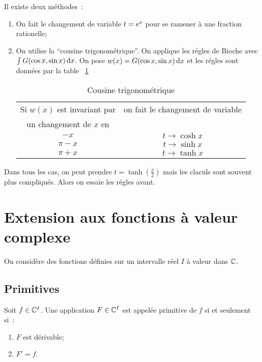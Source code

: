 Il existe deux méthodes~:
\begin{enumerate}
  \item On fait le changement de variable \(t=\operatorname{e}^x\) pour se ramener à une 
    fraction rationelle;
  \item On utilise la ``cousine trigonométrique''. On applique les régles de 
    Bioche avec \(\int G(\cos x,\sin x)\mathop{}\mathopen{}\mathrm{d} x\). On pose \(w(x) = G(\cos x,\sin 
    x) \mathop{}\mathopen{}\mathrm{d} x\) et les régles sont données par la table~
    \ref{tab:cousinetrigo}

    \begin{table}[!h]
      \centering
      \begin{tabular}{|c|c|}\hline
        Si \(w(x)\) est invariant par & on fait le changement de variable \\
        un changement de \(x\) en &  \\ \hline
        \(-x\) & \(t \to \cosh x\)\\
        \(\pi-x\) & \(t \to \sinh x\)\\
        \(\pi+x\) & \(t \to \tanh x\)\\
      \hline\end{tabular}
      \caption{Cousine trigonométrique}
      \label{tab:cousinetrigo}
    \end{table}
\end{enumerate}

Dans tous les cas, on peut prendre \(t=\tanh\left(\frac{x}{2}\right)\) mais les 
claculs sont souvent plus compliqués. Alors on essaie les régles avant.

\section{Extension aux fonctions à valeur complexe}

On considère des fonctions définies sur un intervalle réel \(I\) à valeur dans 
\(\mathbb{C}\).

\subsection{Primitives}

\begin{defdef}
  Soit \(f \in \mathbb{C}^I\). Une application \(F \in \mathbb{C}^I\) est appelée primitive de 
  \(f\) si et seulement si~:
  \begin{enumerate}
    \item \(F\) est dérivable;
    \item \(F'=f\).
  \end{enumerate}
\end{defdef}

